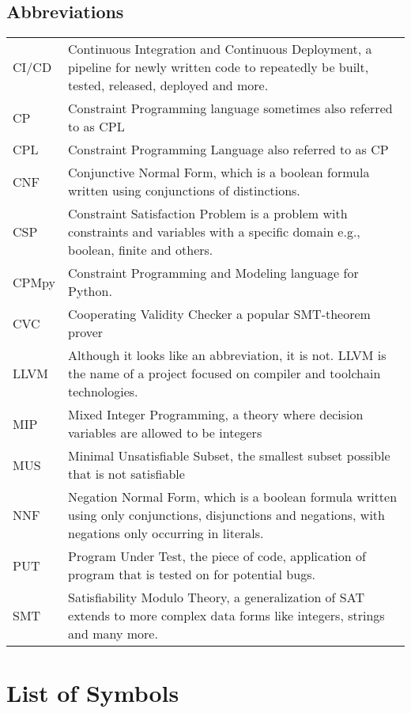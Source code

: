 \documentclass[master=cws, masteroption=se, english, oneside]{kulemt} %
\begin{document}
\section*{Abbreviations}
\begin{flushleft}
  \renewcommand{\arraystretch}{1.1}
  \begin{tabularx}{\textwidth}{@{}p{14mm}X@{}}
  	
	CI/CD & Continuous Integration and Continuous Deployment, a pipeline for newly written code to repeatedly be built, tested, released, deployed and more. \\
    CP & Constraint Programming language sometimes also referred to as CPL \\
    CPL & Constraint Programming Language also referred to as CP \\
    CNF & Conjunctive Normal Form, which is a boolean formula written using conjunctions of distinctions. \\
    CSP & Constraint Satisfaction Problem is a problem with constraints and variables with a specific domain e.g., boolean, finite and others.\\
    CPMpy & Constraint Programming and Modeling language for Python.\\
    CVC & Cooperating Validity Checker a popular SMT-theorem prover \\
    LLVM & Although it looks like an abbreviation, it is not. LLVM is the name of a project focused on compiler and toolchain technologies. \\
    MIP & Mixed Integer Programming, a theory where decision variables are allowed to be integers \\
    MUS & Minimal Unsatisfiable Subset, the smallest subset possible that is not satisfiable \\
    NNF & Negation Normal Form, which is a boolean formula written using only  conjunctions, disjunctions and negations, with negations only occurring in literals. \\
    PUT & Program Under Test, the piece of code, application of program that is tested on for potential bugs. \\
    SMT & Satisfiability Modulo Theory, a generalization of SAT extends to more complex data forms like integers, strings and many more.\\
  \end{tabularx}
\end{flushleft}

\chapter{List of Symbols}
\end{document}
